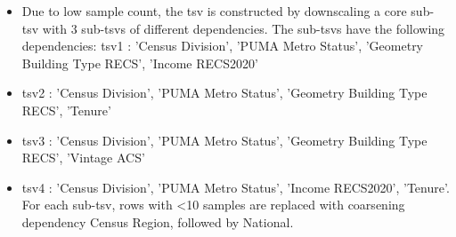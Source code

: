 \begin{itemize}
\item Due to low sample count, the tsv is constructed by downscaling a core sub-tsv with 3 sub-tsvs of different dependencies. The sub-tsvs have the following dependencies: tsv1 : 'Census Division', 'PUMA Metro Status', 'Geometry Building Type RECS', 'Income RECS2020'
\item tsv2 : 'Census Division', 'PUMA Metro Status', 'Geometry Building Type RECS', 'Tenure'
\item tsv3 : 'Census Division', 'PUMA Metro Status', 'Geometry Building Type RECS', 'Vintage ACS'
\item tsv4 : 'Census Division', 'PUMA Metro Status', 'Income RECS2020', 'Tenure'. For each sub-tsv, rows with <10 samples are replaced with coarsening dependency Census Region, followed by National.
\end{itemize}
